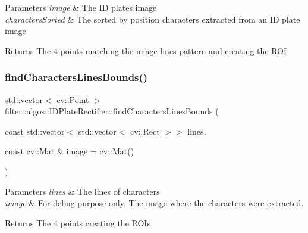 \begin{DoxyParams}{Parameters}
{\em image} & The ID plate\textquotesingle{}s image \\
\hline
{\em characters\+Sorted} & The sorted by position characters extracted from an ID plate image \\
\hline
\end{DoxyParams}
\begin{DoxyReturn}{Returns}
The 4 points matching the image lines pattern and creating the R\+OI 
\end{DoxyReturn}
\mbox{\label{classfilter_1_1algos_1_1_i_d_plate_rectifier_aa3934265c0b997b5f18752e019a6ee11}} 
\subsubsection{\texorpdfstring{find\+Characters\+Lines\+Bounds()}{findCharactersLinesBounds()}}
{\footnotesize\ttfamily std\+::vector$<$ cv\+::\+Point $>$ filter\+::algos\+::\+I\+D\+Plate\+Rectifier\+::find\+Characters\+Lines\+Bounds (\begin{DoxyParamCaption}\item[{const std\+::vector$<$ std\+::vector$<$ cv\+::\+Rect $>$$>$}]{lines,  }\item[{const cv\+::\+Mat \&}]{image = {\ttfamily cv\+:\+:Mat()} }\end{DoxyParamCaption})\hspace{0.3cm}{\ttfamily [private]}}


\begin{DoxyParams}{Parameters}
{\em lines} & The lines of characters \\
\hline
{\em image} & For debug purpose only. The image where the characters were extracted. \\
\hline
\end{DoxyParams}
\begin{DoxyReturn}{Returns}
The 4 points creating the R\+O\+Is 
\end{DoxyReturn}
\mbox{\label{classfilter_1_1algos_1_1_i_d_plate_rectifier_a03f68f887de80fccf153d8896380e0c1}} 
